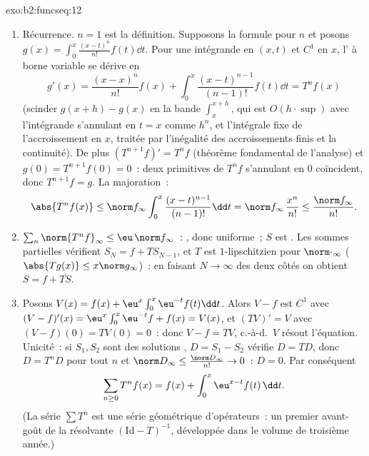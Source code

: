 \begin{solution}{exo:b2:funcseq:12}
\begin{enumerate}
  \item Récurrence. $n = 1$ est la définition. Supposons la formule
        pour $n$ et posons $g(x) = \int_0^x \frac{(x-t)^n}{n!}
        f(t)\dd t$. Pour une intégrande  en $(x,t)$ et
        $C^1$ en $x$, l' à borne variable se
        dérive en
        \[
        g'(x) = \frac{(x-x)^n}{n!}f(x)
        + \int_0^x \frac{(x-t)^{n-1}}{(n-1)!}f(t)\dd t
        = T^nf(x)
        \]
        (scinder $g(x+h) - g(x)$ en la bande
        $\int_x^{x+h}$, qui est $O(h\cdot\sup)$ avec l'intégrande
        s'annulant en $t = x$ comme $h^n$, et l'intégrale fixe de
        l'accroissement en $x$, traitée par l'inégalité des
        accroissements finis et la continuité). De plus $(T^{n+1}f)' =
        T^nf$ (théorème fondamental de l'analyse) et $g(0) =
        T^{n+1}f(0) = 0$~: deux primitives de $T^nf$ s'annulant en
        $0$ coïncident, donc $T^{n+1}f = g$. La majoration~:
        \[
        \abs{T^nf(x)} \leq \norm f_\infty
        \int_0^x \frac{(x-t)^{n-1}}{(n-1)!}\dd t
        = \norm f_\infty\,\frac{x^n}{n!}
        \leq \frac{\norm f_\infty}{n!} .
        \]
  \item $\sum_n \norm{T^nf}_\infty \leq \eu\,\norm f_\infty$~:
        , donc uniforme~; $S$ est .
        Les sommes partielles vérifient $S_N = f + T S_{N-1}$, et $T$
        est $1$-lipschitzien pour $\norm\cdot_\infty$
        ($\abs{Tg(x)} \leq x\norm g_\infty$)~: en faisant $N \to
        \infty$ des deux côtés on obtient $S = f + TS$.
  \item Posons $V(x) = f(x) + \eu^x\int_0^x \eu^{-t}f(t)\dd t$.
        Alors $V - f$ est $C^1$ avec $(V-f)'(x) =
        \eu^x\int_0^x\eu^{-t}f + f(x) = V(x)$, et $(TV)' = V$
        avec $(V - f)(0) = TV(0) = 0$~: donc $V - f = TV$, c.-à-d.\
        $V$ résout l'équation. Unicité~: si $S_1, S_2$ sont des
        solutions , $D = S_1 - S_2$ vérifie $D =
        TD$, donc $D = T^nD$ pour tout $n$ et $\norm D_\infty
        \leq \frac{\norm D_\infty}{n!} \to 0$~: $D = 0$.
        Par conséquent
        \[
        \sum_{n\geq0} T^nf(x) = f(x) +
        \int_0^x \eu^{x-t}f(t)\,\dd t .
        \]
        (La série $\sum T^n$ est une série géométrique
        d'opérateurs~: un premier avant-goût de la résolvante
        $(\mathrm{Id} - T)^{-1}$, développée dans le volume de
        troisième année.)
\end{enumerate}
\end{solution}

